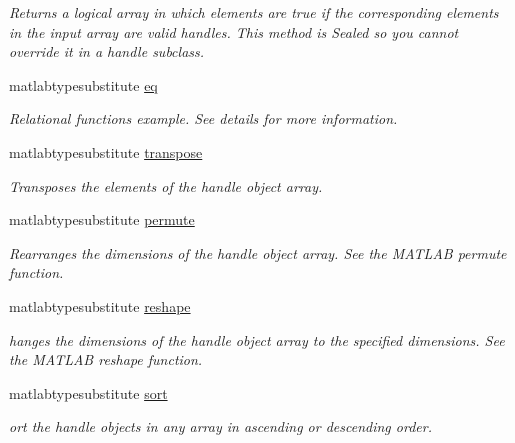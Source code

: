 \begin{DoxyCompactItemize}
\begin{DoxyCompactList}\small\item\em Returns a logical array in which elements are true if the corresponding elements in the input array are valid handles. This method is Sealed so you cannot override it in a handle subclass. \end{DoxyCompactList}\item 
matlabtypesubstitute \hyperlink{classhandle_a2fb018cd603a5ced1783bfb20c6cce86}{eq}
\begin{DoxyCompactList}\small\item\em Relational functions example. See details for more information. \end{DoxyCompactList}\item 
\hypertarget{classhandle_acd9b55f206750374c4dfca508cfff084}{}matlabtypesubstitute \hyperlink{classhandle_acd9b55f206750374c4dfca508cfff084}{transpose}\label{classhandle_acd9b55f206750374c4dfca508cfff084}

\begin{DoxyCompactList}\small\item\em Transposes the elements of the handle object array. \end{DoxyCompactList}\item 
\hypertarget{classhandle_a6dc9f59313af54f392d8e273d71ace7b}{}matlabtypesubstitute \hyperlink{classhandle_a6dc9f59313af54f392d8e273d71ace7b}{permute}\label{classhandle_a6dc9f59313af54f392d8e273d71ace7b}

\begin{DoxyCompactList}\small\item\em Rearranges the dimensions of the handle object array. See the M\+A\+T\+L\+A\+B permute function. \end{DoxyCompactList}\item 
\hypertarget{classhandle_acef58ae5e52255411835a4fcaf2edd49}{}matlabtypesubstitute \hyperlink{classhandle_acef58ae5e52255411835a4fcaf2edd49}{reshape}\label{classhandle_acef58ae5e52255411835a4fcaf2edd49}

\begin{DoxyCompactList}\small\item\em hanges the dimensions of the handle object array to the specified dimensions. See the M\+A\+T\+L\+A\+B reshape function. \end{DoxyCompactList}\item 
matlabtypesubstitute \hyperlink{classhandle_ad11b0be4c173a9d31122c1298eb96a97}{sort}
\begin{DoxyCompactList}\small\item\em ort the handle objects in any array in ascending or descending order. \end{DoxyCompactList}\end{DoxyCompactItemize}



